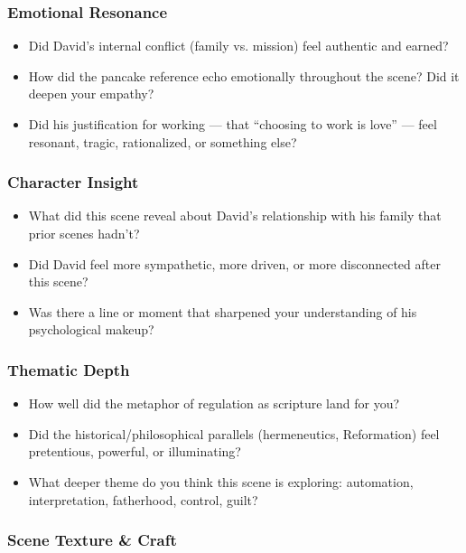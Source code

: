 \subsubsection*{Emotional Resonance}

\begin{itemize}
  \item Did David’s internal conflict (family vs. mission) feel authentic and earned?
  \item How did the pancake reference echo emotionally throughout the scene? Did it deepen your empathy?
  \item Did his justification for working — that “choosing to work is love” — feel resonant, tragic, rationalized, or something else?
\end{itemize}

\subsubsection*{Character Insight}

\begin{itemize}
  \item What did this scene reveal about David’s relationship with his family that prior scenes hadn’t?
  \item Did David feel more sympathetic, more driven, or more disconnected after this scene?
  \item Was there a line or moment that sharpened your understanding of his psychological makeup?
\end{itemize}

\subsubsection*{Thematic Depth}

\begin{itemize}
  \item How well did the metaphor of regulation as scripture land for you?
  \item Did the historical/philosophical parallels (hermeneutics, Reformation) feel pretentious, powerful, or illuminating?
  \item What deeper theme do you think this scene is exploring: automation, interpretation, fatherhood, control, guilt?
\end{itemize}

\subsubsection*{Scene Texture \& Craft}


